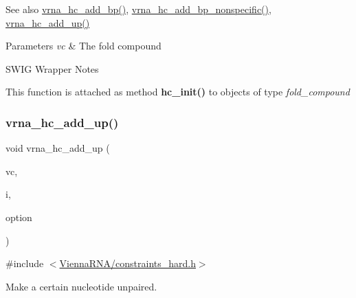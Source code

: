 \begin{DoxySeeAlso}{See also}
\mbox{\hyperlink{group__hard__constraints_ga7cba95ebe2ceb5ec9a5768f2232854fd}{vrna\+\_\+hc\+\_\+add\+\_\+bp()}}, \mbox{\hyperlink{group__hard__constraints_gaed50398ade2d4852c9e82592fe76046c}{vrna\+\_\+hc\+\_\+add\+\_\+bp\+\_\+nonspecific()}}, \mbox{\hyperlink{group__hard__constraints_ga447d88e06ad97bb225cd83310ace8345}{vrna\+\_\+hc\+\_\+add\+\_\+up()}}
\end{DoxySeeAlso}

\begin{DoxyParams}{Parameters}
{\em vc} & The fold compound\\
\hline
\end{DoxyParams}
\begin{DoxyRefDesc}{S\+W\+I\+G Wrapper Notes}
\item[\mbox{\hyperlink{wrappers__wrappers000006}{S\+W\+I\+G Wrapper Notes}}]This function is attached as method {\bfseries hc\+\_\+init()} to objects of type {\itshape fold\+\_\+compound} \end{DoxyRefDesc}
\mbox{\label{group__hard__constraints_ga447d88e06ad97bb225cd83310ace8345}} 
\subsubsection{\texorpdfstring{vrna\+\_\+hc\+\_\+add\+\_\+up()}{vrna\_hc\_add\_up()}}
{\footnotesize\ttfamily void vrna\+\_\+hc\+\_\+add\+\_\+up (\begin{DoxyParamCaption}\item[{\mbox{\hyperlink{group__fold__compound_ga1b0cef17fd40466cef5968eaeeff6166}{vrna\+\_\+fold\+\_\+compound\+\_\+t}} $\ast$}]{vc,  }\item[{int}]{i,  }\item[{unsigned char}]{option }\end{DoxyParamCaption})}



{\ttfamily \#include $<$\mbox{\hyperlink{constraints__hard_8h}{Vienna\+R\+N\+A/constraints\+\_\+hard.\+h}}$>$}



Make a certain nucleotide unpaired. 


